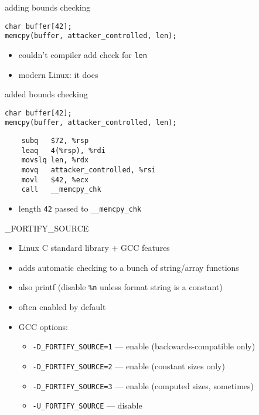 
\begin{frame}[fragile,label=fortifyMemCpyIntro]{adding bounds checking}
\lstset{language=C,style=small}
\begin{lstlisting}
char buffer[42];
memcpy(buffer, attacker_controlled, len);
\end{lstlisting}
    \begin{itemize}
        \item couldn't compiler add check for \texttt{len}
        \item modern Linux: it does
    \end{itemize}
\end{frame}

\begin{frame}[fragile,label=boundsChecking]{added bounds checking}
\lstset{language=C,style=small}
\begin{lstlisting}
char buffer[42];
memcpy(buffer, attacker_controlled, len);
\end{lstlisting}
\lstset{language=myasm,style=small}
\begin{lstlisting}
    subq   $72, %rsp
    leaq   4(%rsp), %rdi
    movslq len, %rdx
    movq   attacker_controlled, %rsi
    movl   $42, %ecx
    call   __memcpy_chk
\end{lstlisting}
    \begin{itemize}
        \item length \texttt{42} passed to \texttt{\_\_memcpy\_chk}
    \end{itemize}
\end{frame}

\begin{frame}{\_FORTIFY\_SOURCE}
    \begin{itemize}
        \item Linux C standard library + GCC features
        \item adds automatic checking to a bunch of string/array functions
        \item also printf (disable \texttt{\%n} unless format string is a constant)
        \vspace{.5cm}
        \item often enabled by default
        \item GCC options:
            \begin{itemize}
                \item \texttt{-D\_FORTIFY\_SOURCE=1} --- enable (backwards-compatible only)
                \item \texttt{-D\_FORTIFY\_SOURCE=2} --- enable (constant sizes only)
                \item \texttt{-D\_FORTIFY\_SOURCE=3} --- enable (computed sizes, sometimes)
                \item \texttt{-U\_FORTIFY\_SOURCE} --- disable
            \end{itemize}
    \end{itemize}
\end{frame}


